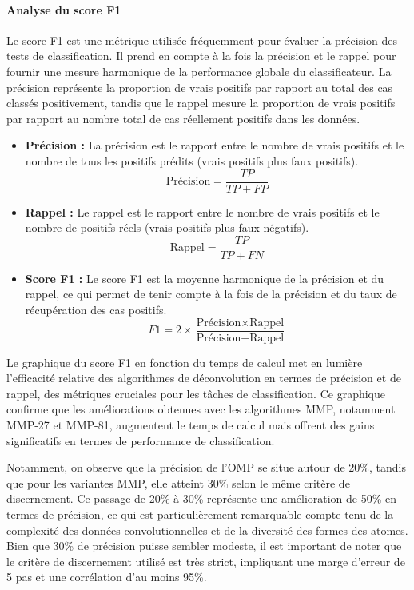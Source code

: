 \documentclass[9pt,a4paper,twoside]{rho}
\begin{document}
\newpage

\paragraph{Analyse du score F1}

Le score F1 est une métrique utilisée fréquemment pour évaluer la précision des tests de classification. Il prend en compte à la fois la précision et le rappel pour fournir une mesure harmonique de la performance globale du classificateur. La précision représente la proportion de vrais positifs par rapport au total des cas classés positivement, tandis que le rappel mesure la proportion de vrais positifs par rapport au nombre total de cas réellement positifs dans les données.

\begin{itemize}
    \item \textbf{Précision :} La précision est le rapport entre le nombre de vrais positifs et le nombre de tous les positifs prédits (vrais positifs plus faux positifs).
    \[ \text{Précision} = \frac{TP}{TP + FP} \]
    \item \textbf{Rappel :} Le rappel est le rapport entre le nombre de vrais positifs et le nombre de positifs réels (vrais positifs plus faux négatifs).
    \[ \text{Rappel} = \frac{TP}{TP + FN} \]
    \item \textbf{Score F1 :} Le score F1 est la moyenne harmonique de la précision et du rappel, ce qui permet de tenir compte à la fois de la précision et du taux de récupération des cas positifs.
    \[ F1 = 2 \times \frac{\text{Précision} \times \text{Rappel}}{\text{Précision} + \text{Rappel}} \]
\end{itemize}

Le graphique du score F1 en fonction du temps de calcul met en lumière l'efficacité relative des algorithmes de déconvolution en termes de précision et de rappel, des métriques cruciales pour les tâches de classification. Ce graphique confirme que les améliorations obtenues avec les algorithmes MMP, notamment MMP-27 et MMP-81, augmentent le temps de calcul mais offrent des gains significatifs en termes de performance de classification.

Notamment, on observe que la précision de l'OMP se situe autour de 20\%, tandis que pour les variantes MMP, elle atteint 30\% selon le même critère de discernement. Ce passage de 20\% à 30\% représente une amélioration de 50\% en termes de précision, ce qui est particulièrement remarquable compte tenu de la complexité des données convolutionnelles et de la diversité des formes des atomes. Bien que 30\% de précision puisse sembler modeste, il est important de noter que le critère de discernement utilisé est très strict, impliquant une marge d'erreur de 5 pas et une corrélation d'au moins 95\%.
\end{document}
